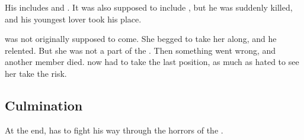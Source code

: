 His \matrix includes  and .
It was also supposed to include , but he was suddenly killed, and his youngest lover  took his place. 

\Criseis was not originally supposed to come.
She begged \Ishnaruchaefir to take her along, and he relented.
But she was not a part of the \matrix.
Then something went wrong, and another \matrix member died.
\Criseis now had to take the last position, as much as \Ishnaruchaefir hated to see her take the risk. 









\subsection{Culmination}
At the end, \Ishnaruchaefir has to fight his way through the horrors of the . 

